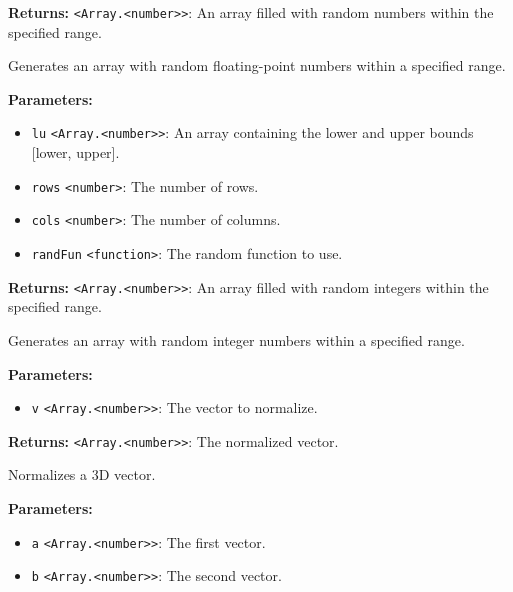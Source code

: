 \documentclass[12pt,a4paper]{article}
\begin{document}
\noindent \textbf{Returns:} \texttt{<Array.<number>>}: An array filled with random numbers within the specified range.

\noindent Generates an array with random floating-point numbers within a specified range.

\vspace{5mm}
\noindent {}


\noindent \textbf{Parameters:}
\begin{itemize}
  \item \texttt{lu} \texttt{<Array.<number>>}: An array containing the lower and upper bounds [lower, upper].
  \item \texttt{rows} \texttt{<number>}: The number of rows.
  \item \texttt{cols} \texttt{<number>}: The number of columns.
  \item \texttt{randFun} \texttt{<function>}: The random function to use.
\end{itemize}

\noindent \textbf{Returns:} \texttt{<Array.<number>>}: An array filled with random integers within the specified range.

\noindent Generates an array with random integer numbers within a specified range.

\vspace{5mm}
\noindent {}


\noindent \textbf{Parameters:}
\begin{itemize}
  \item \texttt{v} \texttt{<Array.<number>>}: The vector to normalize.
\end{itemize}

\noindent \textbf{Returns:} \texttt{<Array.<number>>}: The normalized vector.

\noindent Normalizes a 3D vector.

\vspace{5mm}
\noindent {}


\noindent \textbf{Parameters:}
\begin{itemize}
  \item \texttt{a} \texttt{<Array.<number>>}: The first vector.
  \item \texttt{b} \texttt{<Array.<number>>}: The second vector.
\end{itemize}
\end{document}
